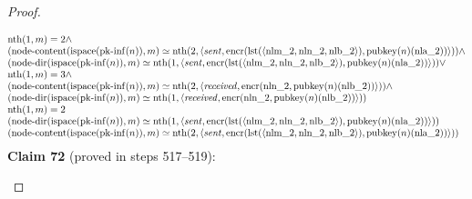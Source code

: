\documentclass[11pt]{article}
\theoremstyle{plain}
\begin{document}
\begin{proof}
\begin{itemize}[leftmargin=2.8em, itemsep=4pt, parsep=1pt]
\begin{itemize}[leftmargin=2.8em, itemsep=4pt, parsep=1pt]
\begin{equation*}
\begin{array}{@{}l@{}}
\begin{array}{@{}l@{}} \operatorname{nth}(1, m) = 2 \wedge \\ (\operatorname{node\text{-}content}(\operatorname{ispace}(\operatorname{pk\text{-}inf}(n)), m) \simeq \operatorname{nth}(2, \langle \mathit{sent}, \operatorname{encr}(\operatorname{lst}(\langle \operatorname{nlm\_2}, \operatorname{nln\_2}, \operatorname{nlb\_2} \rangle), \operatorname{pubkey}(n)(\operatorname{nla\_2})) \rangle)) \wedge \\ (\operatorname{node\text{-}dir}(\operatorname{ispace}(\operatorname{pk\text{-}inf}(n)), m) \simeq \operatorname{nth}(1, \langle \mathit{sent}, \operatorname{encr}(\operatorname{lst}(\langle \operatorname{nlm\_2}, \operatorname{nln\_2}, \operatorname{nlb\_2} \rangle), \operatorname{pubkey}(n)(\operatorname{nla\_2})) \rangle)) \vee \\ \operatorname{nth}(1, m) = 3 \wedge \\ (\operatorname{node\text{-}content}(\operatorname{ispace}(\operatorname{pk\text{-}inf}(n)), m) \simeq \operatorname{nth}(2, \langle \mathit{received}, \operatorname{encr}(\operatorname{nln\_2}, \operatorname{pubkey}(n)(\operatorname{nlb\_2})) \rangle)) \wedge \\ (\operatorname{node\text{-}dir}(\operatorname{ispace}(\operatorname{pk\text{-}inf}(n)), m) \simeq \operatorname{nth}(1, \langle \mathit{received}, \operatorname{encr}(\operatorname{nln\_2}, \operatorname{pubkey}(n)(\operatorname{nlb\_2})) \rangle)) \end{array} \\
\operatorname{nth}(1, m) = 2 \\
(\operatorname{node\text{-}dir}(\operatorname{ispace}(\operatorname{pk\text{-}inf}(n)), m) \simeq \operatorname{nth}(1, \langle \mathit{sent}, \operatorname{encr}(\operatorname{lst}(\langle \operatorname{nlm\_2}, \operatorname{nln\_2}, \operatorname{nlb\_2} \rangle), \operatorname{pubkey}(n)(\operatorname{nla\_2})) \rangle)) \\
(\operatorname{node\text{-}content}(\operatorname{ispace}(\operatorname{pk\text{-}inf}(n)), m) \simeq \operatorname{nth}(2, \langle \mathit{sent}, \operatorname{encr}(\operatorname{lst}(\langle \operatorname{nlm\_2}, \operatorname{nln\_2}, \operatorname{nlb\_2} \rangle), \operatorname{pubkey}(n)(\operatorname{nla\_2})) \rangle))
\end{array}
\end{equation*}
\textbf{Claim 72} (proved in steps 517--519):
\begin{equation*}

\end{equation*}
\end{itemize}
\end{itemize}
\end{proof}
\end{document}
